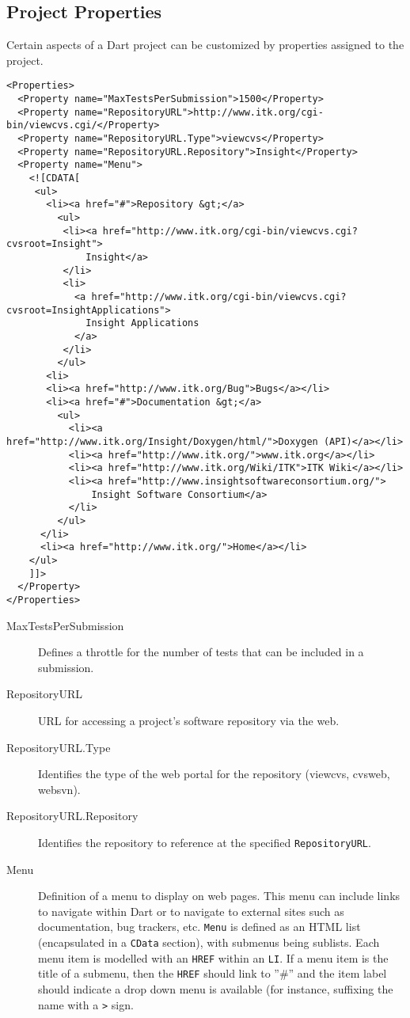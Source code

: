 \documentclass{InsightBook}
\begin{document}
\subsection{Project Properties}
Certain aspects of a Dart project can be customized by properties
assigned to the project.
\begin{verbatim}
<Properties>
  <Property name="MaxTestsPerSubmission">1500</Property>
  <Property name="RepositoryURL">http://www.itk.org/cgi-bin/viewcvs.cgi/</Property>
  <Property name="RepositoryURL.Type">viewcvs</Property>
  <Property name="RepositoryURL.Repository">Insight</Property>
  <Property name="Menu">
    <![CDATA[
     <ul>
       <li><a href="#">Repository &gt;</a>
         <ul>
          <li><a href="http://www.itk.org/cgi-bin/viewcvs.cgi?cvsroot=Insight">
              Insight</a>
          </li>
          <li>
            <a href="http://www.itk.org/cgi-bin/viewcvs.cgi?cvsroot=InsightApplications">
              Insight Applications
            </a>
          </li>
         </ul>
       <li>
       <li><a href="http://www.itk.org/Bug">Bugs</a></li>
       <li><a href="#">Documentation &gt;</a>
         <ul>
           <li><a href="http://www.itk.org/Insight/Doxygen/html/">Doxygen (API)</a></li>
           <li><a href="http://www.itk.org/">www.itk.org</a></li>
           <li><a href="http://www.itk.org/Wiki/ITK">ITK Wiki</a></li>
           <li><a href="http://www.insightsoftwareconsortium.org/">
               Insight Software Consortium</a>
           </li>
         </ul>
      </li>
      <li><a href="http://www.itk.org/">Home</a></li>
    </ul>
    ]]>
  </Property>
</Properties>
\end{verbatim}

\begin{description}
\item[MaxTestsPerSubmission]{Defines a throttle for the number of tests that can be included in a submission.}
\item[RepositoryURL]{URL for accessing a project's software repository via the web.}
\item[RepositoryURL.Type]{Identifies the type of the web portal for the repository (viewcvs, cvsweb, websvn).}
\item[RepositoryURL.Repository]{Identifies the repository to reference at the specified \texttt{RepositoryURL}}.
\item[Menu]{Definition of a menu to display on web pages.  This menu can include links to navigate within Dart or to navigate to external sites such as documentation, bug trackers, etc.  \texttt{Menu} is defined as an HTML list (encapsulated in a \texttt{CData} section), with submenus being sublists.  Each menu item is modelled with an \texttt{HREF} within an \texttt{LI}. If a menu item is the title of a submenu, then the \texttt{HREF} should link to ''\#'' and the item label should indicate a drop down menu is available (for instance, suffixing the name with a \texttt{>} sign.  }
\end{description}
\end{document}
